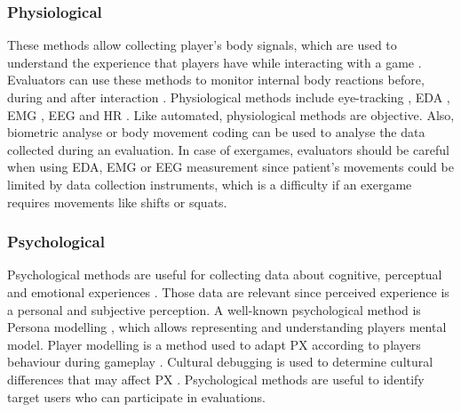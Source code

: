 \subsubsection{Physiological}
These methods allow collecting player’s body signals, which are used to understand the experience that players have while interacting with a game \autocite{Wiemeyer2016,Nacke2015}. Evaluators can use these methods to monitor internal body reactions before, during and after interaction \autocite{Mueller2011}. Physiological methods include eye-tracking \autocite{Wiemeyer2016,Nackea}, \ac{EDA} \autocite{Wiemeyer2016,Nacke2015}, \ac{EMG} \autocite{Wiemeyer2016,Nacke2015}, \ac{EEG} \autocite{Wiemeyer2016,Nacke2015} and \ac{HR} \autocite{Wiemeyer2016,Nacke2015}. Like automated, physiological methods are objective. Also, biometric analyse \autocite{Nacke2009} or body movement coding \autocite{Mueller2015,Nijhar2012} can be used to analyse the data collected during an evaluation. In case of exergames, evaluators should be careful when using \ac{EDA}, \ac{EMG} or \ac{EEG} measurement since patient’s movements could be limited by data collection instruments, which is a difficulty if an exergame requires movements like shifts or squats.

\subsubsection{Psychological}
Psychological methods are useful for collecting data about cognitive, perceptual and emotional experiences \autocite{Wiemeyer2016,Nackea}. Those data are relevant since perceived experience is a personal and subjective perception. A well-known psychological method is Persona modelling \autocite{Wiemeyer2016,Nackea}, which allows representing and understanding players mental model. Player modelling is a method used to adapt \ac{PX} according to players behaviour during gameplay \autocite{Wiemeyer2016,Nackea}. Cultural debugging is used to determine cultural differences that may affect \ac{PX} \autocite{Nackea}. Psychological methods are useful to identify target users who can participate in evaluations.



